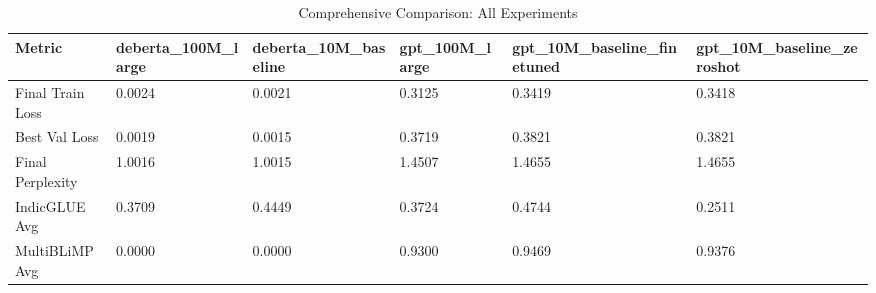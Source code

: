 \begin{table}
\caption{Comprehensive Comparison: All Experiments}
\label{tab:experiment_comparison}
\begin{tabular}{llllll}
\toprule
Metric & deberta_100M_large & deberta_10M_baseline & gpt_100M_large & gpt_10M_baseline_finetuned & gpt_10M_baseline_zeroshot \\
\midrule
Final Train Loss & 0.0024 & 0.0021 & 0.3125 & 0.3419 & 0.3418 \\
Best Val Loss & 0.0019 & 0.0015 & 0.3719 & 0.3821 & 0.3821 \\
Final Perplexity & 1.0016 & 1.0015 & 1.4507 & 1.4655 & 1.4655 \\
IndicGLUE Avg & 0.3709 & 0.4449 & 0.3724 & 0.4744 & 0.2511 \\
MultiBLiMP Avg & 0.0000 & 0.0000 & 0.9300 & 0.9469 & 0.9376 \\
\bottomrule
\end{tabular}
\end{table}

